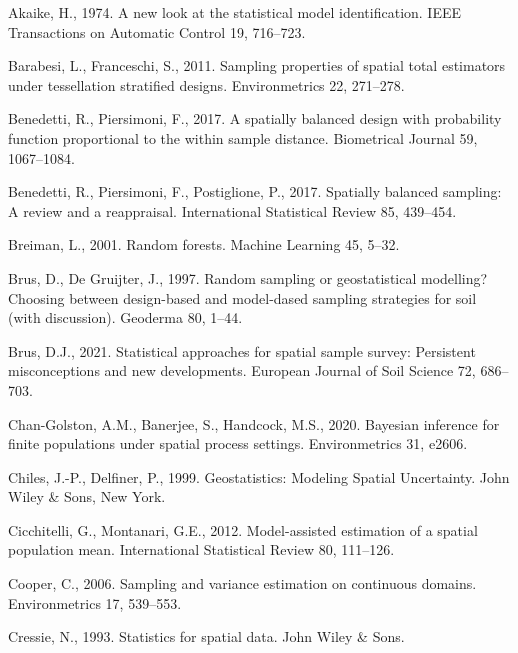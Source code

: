 \documentclass[]{elsarticle} %
\begin{document}
\hypertarget{refs}{}
\leavevmode\hypertarget{ref-akaike1974new}{}%
Akaike, H., 1974. A new look at the statistical model identification.
IEEE Transactions on Automatic Control 19, 716--723.

\leavevmode\hypertarget{ref-barabesi2011sampling}{}%
Barabesi, L., Franceschi, S., 2011. Sampling properties of spatial total
estimators under tessellation stratified designs. Environmetrics 22,
271--278.

\leavevmode\hypertarget{ref-benedetti2017spatially}{}%
Benedetti, R., Piersimoni, F., 2017. A spatially balanced design with
probability function proportional to the within sample distance.
Biometrical Journal 59, 1067--1084.

\leavevmode\hypertarget{ref-benedetti2017spatiallyreview}{}%
Benedetti, R., Piersimoni, F., Postiglione, P., 2017. Spatially balanced
sampling: A review and a reappraisal. International Statistical Review
85, 439--454.

\leavevmode\hypertarget{ref-breiman2001random}{}%
Breiman, L., 2001. Random forests. Machine Learning 45, 5--32.

\leavevmode\hypertarget{ref-brus1997random}{}%
Brus, D., De Gruijter, J., 1997. Random sampling or geostatistical
modelling? Choosing between design-based and model-dased sampling
strategies for soil (with discussion). Geoderma 80, 1--44.

\leavevmode\hypertarget{ref-brus2021statistical}{}%
Brus, D.J., 2021. Statistical approaches for spatial sample survey:
Persistent misconceptions and new developments. European Journal of Soil
Science 72, 686--703.

\leavevmode\hypertarget{ref-chan2020bayesian}{}%
Chan-Golston, A.M., Banerjee, S., Handcock, M.S., 2020. Bayesian
inference for finite populations under spatial process settings.
Environmetrics 31, e2606.

\leavevmode\hypertarget{ref-chiles1999geostatistics}{}%
Chiles, J.-P., Delfiner, P., 1999. Geostatistics: Modeling Spatial
Uncertainty. John Wiley \& Sons, New York.

\leavevmode\hypertarget{ref-cicchitelli2012model}{}%
Cicchitelli, G., Montanari, G.E., 2012. Model-assisted estimation of a
spatial population mean. International Statistical Review 80, 111--126.

\leavevmode\hypertarget{ref-cooper2006sampling}{}%
Cooper, C., 2006. Sampling and variance estimation on continuous
domains. Environmetrics 17, 539--553.

\leavevmode\hypertarget{ref-cressie1993statistics}{}%
Cressie, N., 1993. Statistics for spatial data. John Wiley \& Sons.
\end{document}
